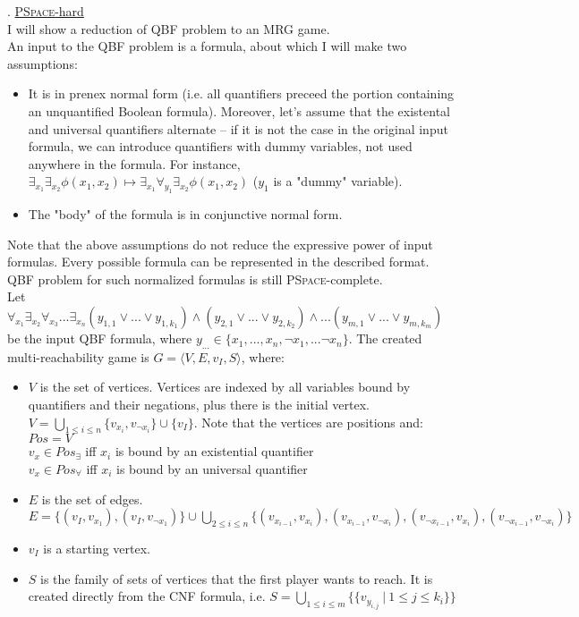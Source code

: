 . \underline{\textsc{PSpace}-hard}\\
I will show a reduction of QBF problem to an MRG game.\\
An input to the QBF problem is a formula, about which I will make two assumptions:
\begin{itemize}
    \item It is in prenex normal form (i.e. all quantifiers preceed the portion
    containing an unquantified Boolean formula). Moreover, let's assume that the
    existental and universal quantifiers alternate -- if it is not the case in the
    original input formula, we can introduce quantifiers with dummy variables, not
    used anywhere in the formula. For instance, $\exists_{x_1} \exists_{x_2}
    \phi(x_1, x_2) \mapsto \exists_{x_1} \forall_{y_1} \exists_{x_2} \phi(x_1, x_2)$
    ($y_1$ is a "dummy" variable).
    \item The "body" of the formula is in conjunctive normal form.
\end{itemize}
Note that the above assumptions do not reduce the expressive power of input formulas.
Every possible formula can be represented in the described format. QBF problem for
such normalized formulas is still \textsc{PSpace}-complete.\\
Let $\forall_{x_1} \exists_{x_2} \forall_{x_3} ... \exists_{x_n}
(y_{1,1} \lor ... \lor y_{1,k_1}) \land (y_{2,1} \lor ... \lor y_{2,k_2}) \land ... (y_{m,1} \lor ... \lor y_{m,k_m})$
be the input QBF formula, where $y_{...} \in \{x_1, ..., x_n, \lnot x_1, ... \lnot x_n \}$.
The created multi-reachability game is $G = \langle V, E, v_I, S \rangle$, where:
\begin{itemize}
    \item $V$ is the set of vertices. Vertices are indexed by all variables bound by
          quantifiers and their negations, plus there is the initial vertex.
          $V = \underset{1 \leq i \leq n}{\bigcup} \{v_{x_i}, v_{\lnot {x_i}}\} \cup \{v_I\}$.
          Note that the vertices are positions and:\\
          $Pos = V$\\
          $v_x \in Pos_{\exists}$ iff $x_i$ is bound by an existential quantifier\\
          $v_x \in Pos_{\forall}$ iff $x_i$ is bound by an universal quantifier
    \item $E$ is the set of edges.
          $E = \{(v_I, v_{x_1}), (v_I, v_{\lnot x_1})\} \cup
          \underset{2 \leq i \leq n}{\bigcup} \{ (v_{x_{i-1}}, v_{x_i}), (v_{x_{i-1}}, v_{\lnot x_i}),
          (v_{\lnot x_{i-1}}, v_{x_i}), (v_{\lnot x_{i-1}}, v_{\lnot x_i}) \}$
    \item $v_I$ is a starting vertex.
    \item $S$ is the family of sets of vertices that the first player wants to reach.
          It is created directly from the CNF formula, i.e.
          $S = \underset{1 \leq i \leq m}{\bigcup} \{ \{ v_{y_{i,j}}\ |\ 1 \leq j \leq k_i \} \}$
\end{itemize}
